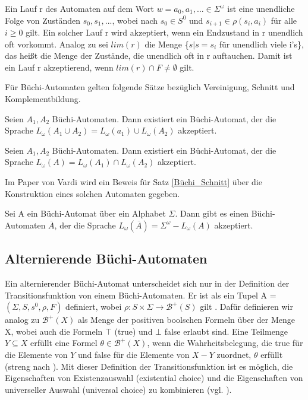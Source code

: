 Ein Lauf r des Automaten auf dem Wort $w=a_0,a_1,... \in \Sigma^{\omega}$ ist eine unendliche Folge von Zuständen $s_0,s_1,...$, wobei nach \cite{vardi+96} $s_0 \in S^0$ und $s_{i+1} \in \rho(s_i, a_i)$ für alle $i \geq 0$ gilt. Ein solcher Lauf r wird akzeptiert, wenn ein Endzustand in r unendlich oft vorkommt. Analog zu \cite{vardi+96} sei $lim(r)$ die Menge \{$s|s=s_i$ für unendlich viele i's\}, das heißt die Menge der Zustände, die unendlich oft in r auftauchen. Damit ist ein Lauf r akzeptierend, wenn $lim(r)\cap F \neq \emptyset$ gilt.

Für Büchi-Automaten gelten folgende Sätze bezüglich Vereinigung, Schnitt und Komplementbildung. 

\begin{satz}\cite{choueka74, vardi+96}
\label{Büchi_Vereinigung}
Seien $A_1, A_2$ Büchi-Automaten. Dann existiert ein Büchi-Automat, der die Sprache $L_{\omega}(A_1\cup A_2)=L_{\omega}(a_1)\cup L_{\omega}(A_2)$ akzeptiert.
\end{satz}
\begin{satz}\cite{choueka74,vardi+96}
\label{Büchi_Schnitt}
Seien $A_1, A_2$ Büchi-Automaten. Dann existiert ein Büchi-Automat, der die Sprache $L_{\omega}(A)=L_{\omega}(A_1)\cap L_{\omega}(A_2)$ akzeptiert.
\end{satz}
Im Paper von Vardi \cite{vardi+96} wird ein Beweis für Satz \ref{Büchi_Schnitt} über die Konstruktion eines solchen Automaten gegeben.
\begin{satz}\cite{buechi62,vardi+96}
\label{Büchi_Komplement}
Sei A ein Büchi-Automat über ein Alphabet $\Sigma$. Dann gibt es einen Büchi-Automaten $\overline{A}$, der die Sprache $L_\omega(\overline{A})=\Sigma^\omega - L_\omega(A)$ akzeptiert.
\end{satz}

\subsection{Alternierende Büchi-Automaten}
\label{subsec:aba}
Ein alternierender Büchi-Automat unterscheidet sich nur in der Definition der Transitionsfunktion von einem Büchi-Automaten. Er ist als ein Tupel A = $(\Sigma,S,s^0,\rho,F)$ definiert, wobei $\rho : S \times \Sigma \rightarrow \mathcal{B}^+(S)$ gilt \cite{vardi+96}. Dafür definieren wir analog zu \cite{vardi+96} $\mathcal{B}^+(X)$ als Menge der positiven boolschen Formeln über der Menge X, wobei auch die Formeln $\top$ (true) und $\bot$ false erlaubt sind. Eine Teilmenge $Y \subseteq X$ erfüllt eine Formel $\theta \in \mathcal{B}^+(X)$, wenn die Wahrheitsbelegung, die true für die Elemente von $Y$ und false für die Elemente von $X-Y$ zuordnet, $\theta$ erfüllt (streng nach \cite{vardi+96}). Mit dieser Definition der Transitionsfunktion ist es möglich, die Eigenschaften von Existenzauswahl (existential choice) und die Eigenschaften von universeller Auswahl (universal choice) zu kombinieren (vgl. \cite{vardi+96}).

